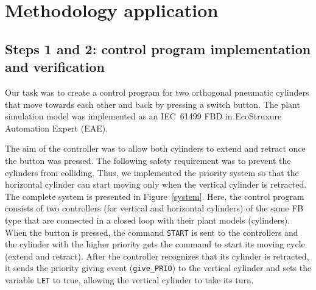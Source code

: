 \documentclass[conference]{IEEEtran}
\begin{document}

\section {Methodology application}
\label{sec:methodappl}
\subsection{Steps 1 and 2: control program implementation and verification}

Our task was to create a control program for two orthogonal pneumatic cylinders that move towards each other and back by pressing a switch button. The plant simulation model was implemented as an IEC~61499 FBD in EcoStruxure Automation Expert (EAE).

The aim of the controller was to allow both cylinders to extend and retract once the button was pressed. The following safety requirement was to prevent the cylinders from colliding.
Thus, we implemented the priority system so that the horizontal cylinder can start moving only when the vertical cylinder is retracted. The complete system is presented in Figure~\ref{system}. Here, the control program consists of two controllers (for vertical and horizontal cylinders) of the same FB type that are connected in a closed loop with their plant models (cylinders). When the button is pressed, the command \texttt{START} is sent to the controllers and the cylinder with the higher priority gets the command to start its moving cycle (extend and retract). After the controller recognizes that its cylinder is retracted, it sends the priority giving event (\texttt{give\_PRIO}) to the vertical cylinder and sets the variable \texttt{LET} to true, allowing the vertical cylinder to take its turn.
\end{document}
